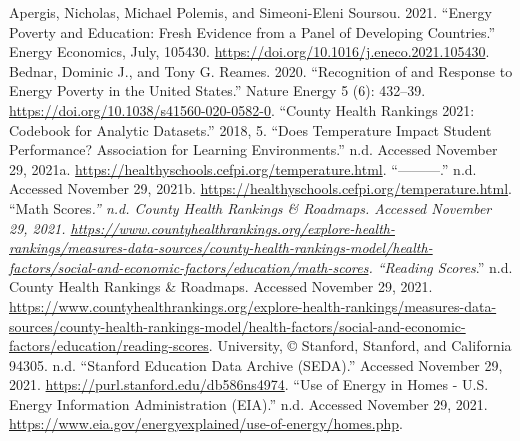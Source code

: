\documentclass[
]{article}
\begin{document}
Apergis, Nicholas, Michael Polemis, and Simeoni-Eleni Soursou. 2021.
``Energy Poverty and Education: Fresh Evidence from a Panel of
Developing Countries.'' Energy Economics, July, 105430.
\url{https://doi.org/10.1016/j.eneco.2021.105430}. Bednar, Dominic J.,
and Tony G. Reames. 2020. ``Recognition of and Response to Energy
Poverty in the United States.'' Nature Energy 5 (6): 432--39.
\url{https://doi.org/10.1038/s41560-020-0582-0}. ``County Health
Rankings 2021: Codebook for Analytic Datasets.'' 2018, 5. ``Does
Temperature Impact Student Performance? \textbar{} Association for
Learning Environments.'' n.d. Accessed November 29, 2021a.
\url{https://healthyschools.cefpi.org/temperature.html}. ``---------.''
n.d. Accessed November 29, 2021b.
\url{https://healthyschools.cefpi.org/temperature.html}. ``Math
Scores\emph{.'' n.d. County Health Rankings \& Roadmaps. Accessed
November 29, 2021.
\url{https://www.countyhealthrankings.org/explore-health-rankings/measures-data-sources/county-health-rankings-model/health-factors/social-and-economic-factors/education/math-scores}.
``Reading Scores}.'' n.d. County Health Rankings \& Roadmaps. Accessed
November 29, 2021.
\url{https://www.countyhealthrankings.org/explore-health-rankings/measures-data-sources/county-health-rankings-model/health-factors/social-and-economic-factors/education/reading-scores}.
University, © Stanford, Stanford, and California 94305. n.d. ``Stanford
Education Data Archive (SEDA).'' Accessed November 29, 2021.
\url{https://purl.stanford.edu/db586ns4974}. ``Use of Energy in Homes -
U.S. Energy Information Administration (EIA).'' n.d. Accessed November
29, 2021.
\url{https://www.eia.gov/energyexplained/use-of-energy/homes.php}.
\end{document}
